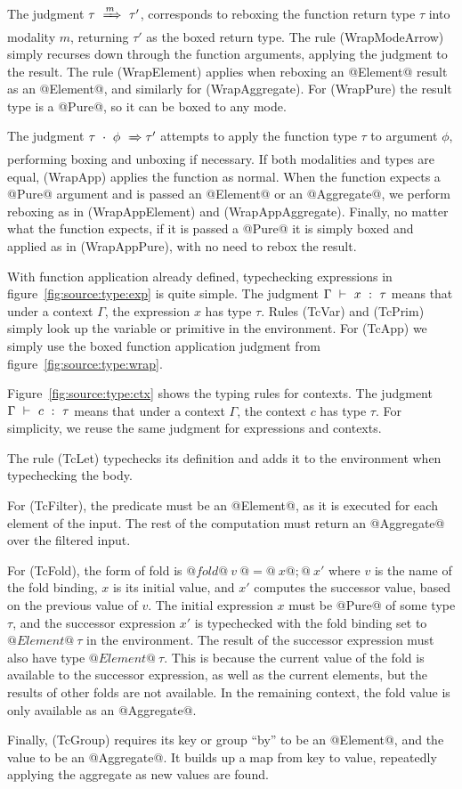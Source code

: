 The judgment $\tau ~\xRightarrow{m}~ \tau'$, corresponds to reboxing the function return type $\tau$ into modality $m$, returning $\tau'$ as the boxed return type.
The rule (WrapModeArrow) simply recurses down through the function arguments, applying the judgment to the result.
The rule (WrapElement) applies when reboxing an @Element@ result as an @Element@, and similarly for (WrapAggregate).
For (WrapPure) the result type is a @Pure@, so it can be boxed to any mode.

The judgment $\tau~\cdot~\phi ~\xRightarrow~ \tau'$ attempts to apply the function type $\tau$ to argument $\phi$, performing boxing and unboxing if necessary.
If both modalities and types are equal, (WrapApp) applies the function as normal.
When the function expects a @Pure@ argument and is passed an @Element@ or an @Aggregate@, we perform reboxing as in (WrapAppElement) and (WrapAppAggregate).
Finally, no matter what the function expects, if it is passed a @Pure@ it is simply boxed and applied as in (WrapAppPure), with no need to rebox the result.




With function application already defined, typechecking expressions in figure~\ref{fig:source:type:exp} is quite simple.
The judgment $\Gamma ~\vdash~ x ~:~ \tau$ means that under a context $\Gamma$, the expression $x$ has type $\tau$.
Rules (TcVar) and (TcPrim) simply look up the variable or primitive in the environment.
For (TcApp) we simply use the boxed function application judgment from figure~\ref{fig:source:type:wrap}.



Figure~\ref{fig:source:type:ctx} shows the typing rules for contexts.
The judgment $\Gamma ~\vdash~ c ~:~ \tau$ means that under a context $\Gamma$, the context $c$ has type $\tau$.
For simplicity, we reuse the same judgment for expressions and contexts.

The rule (TcLet) typechecks its definition and adds it to the environment when typechecking the body.

For (TcFilter), the predicate must be an @Element@, as it is executed for each element of the input.
The rest of the computation must return an @Aggregate@ over the filtered input.

For (TcFold), the form of fold is $@fold@~v~@=@~x@;@~x'$ where $v$ is the name of the fold binding, $x$ is its initial value, and $x'$ computes the successor value, based on the previous value of $v$.
The initial expression $x$ must be @Pure@ of some type $\tau$, and the successor expression $x'$ is typechecked with the fold binding set to $@Element@~\tau$ in the environment.
The result of the successor expression must also have type $@Element@~\tau$.
This is because the current value of the fold is available to the successor expression, as well as the current elements, but the results of other folds are not available.
In the remaining context, the fold value is only available as an @Aggregate@.

Finally, (TcGroup) requires its key or group ``by'' to be an @Element@, and the value to be an @Aggregate@.
It builds up a map from key to value, repeatedly applying the aggregate as new values are found.





